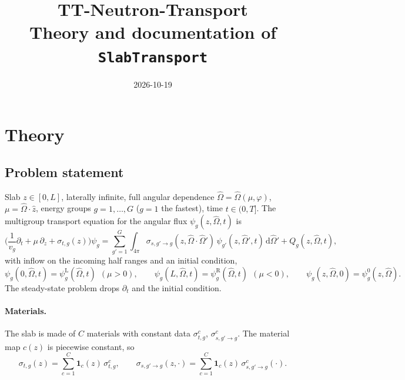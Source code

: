 \documentclass[11pt,a4paper]{article}
\title{TT-Neutron-Transport\\[2pt]\large Theory and documentation of \texttt{SlabTransport}}
\date{2026-10-19}
\newcommand{\Om}{\hat{\Omega}}
\newcommand{\dd}{\mathrm{d}}
\begin{document}
\maketitle
\sloppy
\tableofcontents

\section{Theory}
\label{sec:theory}

\subsection{Problem statement}
\label{sec:problem}

Slab $z\in[0,L]$, laterally infinite, full angular dependence $\Om=\Om(\mu,\varphi)$, $\mu=\Om\cdot\hat z$, energy groups $g=1,\dots,G$ ($g=1$ the fastest), time $t\in(0,T]$. The multigroup transport equation for the angular flux $\psi_g(z,\Om,t)$ is
\begin{equation}
\Big(\frac{1}{v_g}\partial_t+\mu\,\partial_z+\sigma_{t,g}(z)\Big)\psi_g
=\sum_{g'=1}^{G}\int_{4\pi}\sigma_{s,g'\to g}(z,\Om\cdot\Om')\,\psi_{g'}(z,\Om',t)\,\dd\Om'+Q_g(z,\Om,t),
\label{eq:transport}
\end{equation}
with inflow on the incoming half ranges and an initial condition,
\begin{equation}
\psi_g(0,\Om,t)=\psi^{\mathrm L}_g(\Om,t)\ \ (\mu>0),\qquad
\psi_g(L,\Om,t)=\psi^{\mathrm R}_g(\Om,t)\ \ (\mu<0),\qquad
\psi_g(z,\Om,0)=\psi^{0}_g(z,\Om).
\end{equation}
The steady-state problem drops $\partial_t$ and the initial condition.

\paragraph{Materials.} The slab is made of $C$ materials with constant data $\sigma^c_{t,g}$, $\sigma^{c}_{s,g'\to g}$. The material map $c(z)$ is piecewise constant, so
\begin{equation}
    \sigma_{t,g}(z)=\sum_{c=1}^{C}\mathbf{1}_c(z)\,\sigma^c_{t,g},\qquad
    \sigma_{s,g'\to g}(z,\cdot)=\sum_{c=1}^{C}\mathbf{1}_c(z)\,\sigma^c_{s,g'\to g}(\cdot).
\label{eq:materials}
\end{equation}
\end{document}
